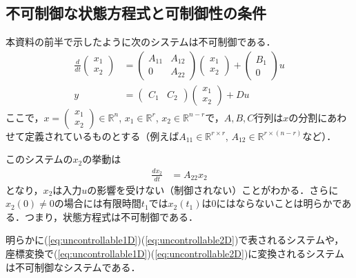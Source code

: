 \subsection{不可制御な状態方程式と可制御性の条件}

本資料の前半で示したように次のシステムは不可制御である．
\begin{align}
 \frac{d}{dt}
  \left(\begin{array}{c}
         {x}_1 \\
	 {x}_2 
	\end{array}\right)
  &=
  \left(\begin{array}{cc}
         {A}_{11} & {A}_{12} \\
	     0        & {A}_{22}
	\end{array}\right)
  \left(\begin{array}{c}
         {x}_1 \\
	 {x}_2 
	\end{array}\right)
  +
  \left(\begin{array}{c}
         {B}_1 \\
	 0
	\end{array}\right)
  u 
\label{eq:uncontrollable1D}\\
 y &=
  \left(\begin{array}{cc}
         {C}_1 & {C}_2 
	\end{array}\right)
  \left(\begin{array}{c}
         {x}_1 \\
	 {x}_2 
	\end{array}\right)
  + D u
\label{eq:uncontrollable2D}
\end{align}
ここで，$x = \left(\begin{array}{c} {x}_1 \\ {x}_2 \end{array}\right) \in {\mathbb R}^n$, 
$x_1 \in {\mathbb R}^r$, $x_2 \in {\mathbb R}^{n-r}$で，$A,B,C$行列は$x$の分割にあわせて定義されているものとする（例えば$A_{11} \in {\mathbb R}^{r \times r}$, $A_{12} \in {\mathbb R}^{r \times (n-r)}$など）．

このシステムの$x_2$の挙動は
\begin{align}
 \frac{dx_2}{dt} &= A_{22} x_2
\end{align}
となり，$x_2$は入力$u$の影響を受けない（制御されない）ことがわかる．さらに$x_2(0) \neq 0$の場合には有限時間$t_1$では$x_2(t_1)$は$0$にはならないことは明らかである．つまり，状態方程式は不可制御である．

明らかに(\ref{eq:uncontrollable1D})(\ref{eq:uncontrollable2D})で表されるシステムや，座標変換で(\ref{eq:uncontrollable1D})(\ref{eq:uncontrollable2D})に変換されるシステムは不可制御なシステムである．

